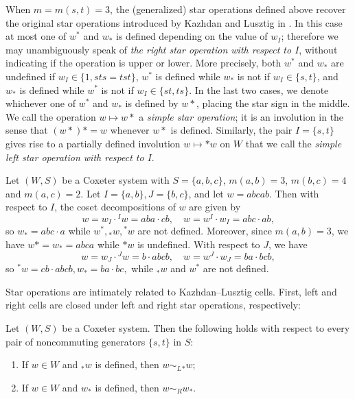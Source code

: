 \documentclass[ALCO,Unicode,published]{cedram}
\newcommand{\kl}{Kazhdan--Lusztig }
\begin{document}
When $m=m(s,t)=3$, the (generalized) star operations defined above recover the original star operations introduced
by Kazhdan and Lusztig in \cite{KL}. In this case at most one of $w^*$ and $w_*$ is defined depending on the value
of $w_I$; therefore we may unambiguously speak of \emph{the right star operation with respect to $I$}, without
indicating if the operation is upper or lower. More precisely, both $w^*$ and $w_*$ are undefined if $w_I\in
\{1,sts=tst\}$, $w^*$ is defined while $w_*$ is not if $w_I\in\{s,t\}$, and $w_*$ is defined while $w^*$ is not if
$w_I\in \{st,ts\}$. In the last two cases, we denote whichever one of $w^*$ and $w_*$ is
defined by $w*$,
placing the star sign in the middle. We call the operation $w\mapsto w*$ a \emph{simple star operation}; it is an
involution in the sense that $(w*)*=w$ whenever $w*$ is defined. Similarly, the pair $I=\{s,t\}$ gives rise to a
partially defined involution $w\mapsto *w$ on $W$ that we call the \emph{simple left star operation with respect to
$I$}.

\begin{example}
    \label{eg:StarOperation} 
    Let $(W,S)$ be a Coxeter system with $S=\{a,b,c\}$, $m(a,b)=3$, $m(b,c)=4$ and $m(a,c)=2$. Let $I=\{a,b\},
    J=\{b,c\}$, and let $w=abcab$. Then with respect to $I$, the coset decompositions of $w$ are given by \[ w=
    w_I\cdot {}^I w= aba\cdot cb, \quad w= w^I \cdot w_I = abc\cdot ab, \] so $w_*=abc\cdot a$ while $w^*,
    {}_* w, {}^* w$ are not defined.  Moreover, since $m(a,b)=3$, we have $w*=w_*=abca$ while $*w$ is undefined.
    With respect to $J$, we have \[ w=w_J\cdot {}^J w=b\cdot abcb, \quad w=w^J\cdot w_J=ba\cdot bcb,
    \] so
    ${}^{*}w=cb\cdot abcb, w_*=ba\cdot bc,$ while ${}_*w$ and $w^*$ are not defined.  
\end{example}

Star operations are intimately related to \kl cells. First, left and right cells are closed under left and right
star operations, respectively: 
\begin{prop}
    \label{prop:StarOpAndCells} 
    Let $(W,S)$ be a Coxeter system. Then the following holds with respect to every pair of noncommuting generators
    $\{s,t\}$ in  $S$:
    \begin{enumerate}
        \item  If $w\in W$ and ${}_* w$ is defined, then $w\sim_L {}_* w$;
        \item  If $w\in W$ and $w_*$ is defined, then $w\sim_R w_*$.
    \end{enumerate}
\end{prop}
\end{document}
